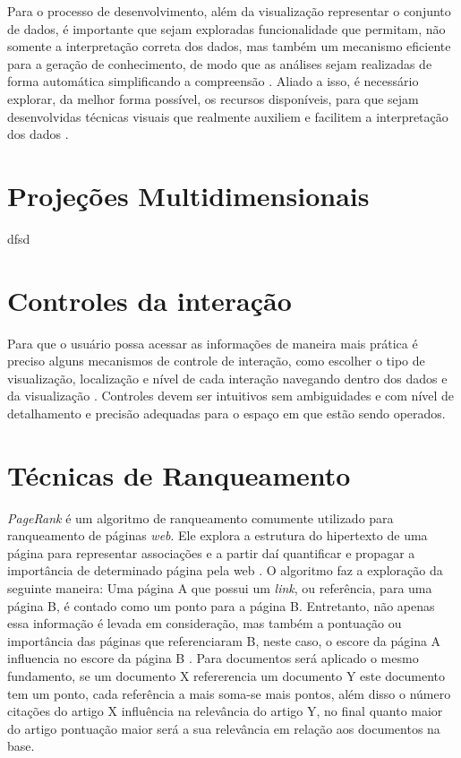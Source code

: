 Para o processo de desenvolvimento, além da visualização representar o conjunto de dados, é importante que sejam exploradas funcionalidade que permitam, não somente a interpretação correta dos dados, mas também um mecanismo eficiente para a geração de conhecimento, de modo que as análises sejam realizadas de forma automática simplificando a compreensão \cite{keim2006challenges}. Aliado a isso, é necessário explorar, da melhor forma possível, os recursos disponíveis, para que sejam desenvolvidas técnicas visuais que realmente auxiliem e facilitem a interpretação dos dados \cite{keim2006challenges}.



\section{Projeções Multidimensionais}
\label{Projecoesmultidimensionais}


dfsd

\section{Controles da interação}

Para que o usuário possa acessar as informações de maneira mais prática é preciso alguns mecanismos de controle de interação, como escolher o tipo de visualização, localização e nível de cada interação navegando dentro dos dados e da visualização \cite{ward2015interactive}. Controles devem ser intuitivos sem ambiguidades e com nível de detalhamento e precisão adequadas para o espaço em que estão sendo operados\cite{ward2015interactive}. 

\section{Técnicas de Ranqueamento}

\textit{PageRank} é um algoritmo de ranqueamento comumente utilizado para ranqueamento de páginas \textit{web}. Ele explora a estrutura do hipertexto de uma página para representar associações e a partir daí quantificar e propagar a importância de determinado página pela web \cite{langville2011google}.
O algoritmo faz a exploração da seguinte maneira: Uma página A que possui um \textit{link}, ou referência, para uma página B, é contado como um ponto para a página B. Entretanto, não apenas essa informação é levada em consideração, mas também a pontuação ou importância das páginas que referenciaram B, neste caso, o escore da página A influencia no escore da página B \cite{de2006mecanismos}. 
Para documentos será aplicado o mesmo fundamento, se um documento X refererencia um documento Y este documento tem um ponto, cada referência a mais soma-se mais pontos, além disso o número citações do artigo X influência na relevância do artigo Y, no final quanto maior do artigo pontuação maior será a sua relevância em relação aos documentos na base.

